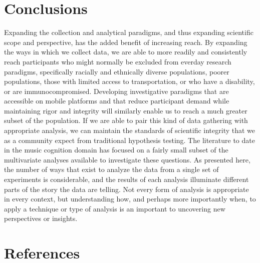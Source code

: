 \documentclass[
  english,
  man,floatsintext]{apa6}
\begin{document}
\hypertarget{conclusions}{%
\section{Conclusions}\label{conclusions}}

Expanding the collection and analytical paradigms, and thus expanding scientific scope and perspective, has the added benefit of increasing reach. By expanding the ways in which we collect data, we are able to more readily and consistently reach participants who might normally be excluded from everday research paradigms, specifically racially and ethnically diverse populations, poorer populations, those with limited access to transportation, or who have a disability, or are immunocompromised. Developing investigative paradigms that are accessible on mobile platforms and that reduce participant demand while maintaining rigor and integrity will similarly enable us to reach a much greater subset of the population. If we are able to pair this kind of data gathering with appropriate analysis, we can maintain the standards of scientific integrity that we as a community expect from traditional hypothesis testing. The literature to date in the music cognition domain has focused on a fairly small subset of the multivariate analyses available to investigate these questions. As presented here, the number of ways that exist to analyze the data from a single set of experiments is considerable, and the results of each analysis illuminate different parts of the story the data are telling. Not every form of analysis is appropriate in every context, but understanding how, and perhaps more importantly when, to apply a technique or type of analysis is an important to uncovering new perspectives or insights.

\newpage

\hypertarget{references}{%
\section{References}\label{references}}

\begingroup
\setlength{\parindent}{-0.5in}
\setlength{\leftskip}{0.5in}
\end{document}
